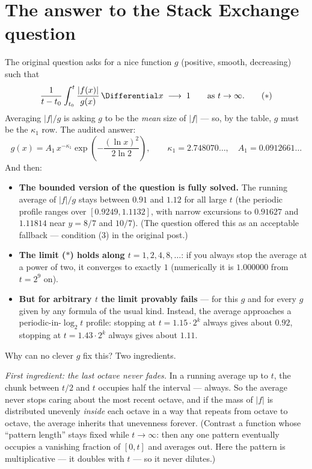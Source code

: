 \documentclass[11pt,oneside]{article}
\theoremstyle{remark}
\begin{document}
\section{The answer to the Stack Exchange question}
\label{sec:answer}

The original question asks for a nice function $g$ (positive, smooth,
decreasing) such that
\[
 \frac{1}{t-t_0}\int_{t_0}^{t}\frac{|f(x)|}{g(x)}\,\Differential x
 \;\longrightarrow\;1
 \qquad\text{as } t\to\infty .
 \tag{$\ast$}
\]
Averaging $|f|/g$ is asking $g$ to be the \emph{mean} size of $|f|$
--- so, by the table, $g$ must be the $\kappa_1$ row.  The audited
answer:
\[
 \boxed{\;
 g(x)=A_1\,x^{-\kappa_1}
 \exp\!\left(-\frac{(\ln x)^2}{2\ln 2}\right),
 \qquad
 \kappa_1=2.748070\ldots,\quad
 A_1=0.0912661\ldots
 \;}
\]
And then:

\begin{itemize}
\item \textbf{The bounded version of the question is fully solved.}
The running average of $|f|/g$ stays between $0.91$ and $1.12$ for all
large $t$ (the periodic profile ranges over $[0.9249,1.1132]$, with
narrow excursions to $0.91627$ and $1.11814$ near $y=8/7$ and $10/7$).
(The question offered this as an acceptable fallback ---
condition (3) in the original post.)
\item \textbf{The limit ($\ast$) holds along $t=1,2,4,8,\dots$}: if
you always stop the average at a power of two, it converges to
exactly $1$ (numerically it is $1.000000$ from $t=2^9$ on).
\item \textbf{But for arbitrary $t$ the limit provably fails} ---
for this $g$ and for every $g$ given by any formula of the usual
kind.  Instead, the average approaches a periodic-in-$\log_2t$
profile: stopping at $t=1.15\cdot2^k$ always gives about $0.92$,
stopping at $t=1.43\cdot2^k$ always gives about $1.11$.
\end{itemize}

Why can no clever $g$ fix this?  Two ingredients.

\emph{First ingredient: the last octave never fades.}  In a running
average up to $t$, the chunk between $t/2$ and $t$ occupies half the
interval --- always.  So the average never stops caring about the most
recent octave, and if the mass of $|f|$ is distributed unevenly
\emph{inside} each octave in a way that repeats from octave to octave,
the average inherits that unevenness forever.  (Contrast a function
whose ``pattern length'' stays fixed while $t\to\infty$: then any one
pattern eventually occupies a vanishing fraction of $[0,t]$ and
averages out.  Here the pattern is multiplicative --- it doubles with
$t$ --- so it never dilutes.)
\end{document}
